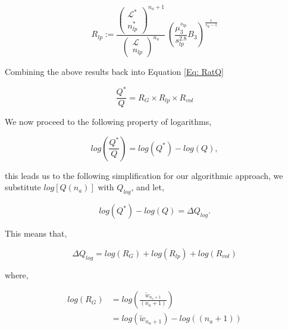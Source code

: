\documentclass[12pt,letterpaper]{article}
\newcommand{\leng}{\mathcal{L}}
\newcommand{\lr}[1]{\left( #1 \right)}
\newcommand{\lrb}[1]{\left[ #1 \right]}
\begin{document}
\begin{equation}
    R_{lp}:=
    \frac{
        \lr{
        \begin{array}{c}
             \leng^{*}\\
             n_{lp}^{*} 
        \end{array}
        }^{n_a+1}   
}{
        \lr{
        \begin{array}{c}
             \leng\\
             n_{lp}
        \end{array}
        }^{n_a}
}
~
\lr{
    \frac{
        \mu_3^{
            s_{lp}
        }
    }{
        s_{lp}^{2.8}
    }
    B_3
}
^{
    \frac{
        r
    }{
        s_{lp}-1
    }
}
\end{equation}


Combining the above results back into Equation \ref{Eq: RatQ}


\begin{equation}
    \frac{
        Q^{*}
    }{
        Q
    }
    =
    R_{G}
    \times
    R_{lp}
    \times
    R_{vol}
\label{finalflee}
\end{equation}

We now proceed to the following property of logarithms, 

\begin{equation}
    log
    \lr{
    \frac{
            Q^{*}
        }{
            Q
        }
    }
    =
    log(Q^{*})-log(Q),
\end{equation}

this leads us to the following simplification for our algorithmic approach, we substitute $log\lrb{Q(n_a)}$ with $Q_{log}$, and let,

\begin{equation}
log(Q^{*})
-
log(Q)
=
\Delta Q_{log}.
\label{eq.letdeltaq}
\end{equation}

This means that,

\begin{equation}
    \Delta Q_{log}    
    =
    log\lr{
        R_{G}
    }
    +
    log\lr{
        R_{lp}
    }
    +
    log\lr{
        R_{vol}
    }
\end{equation}

where,

\begin{align}
    log
    \lr{
    R_{G}
    }
    &=
    log
    \lr{
    \frac{
                \tilde{w}_{n_a+1}       
    }{ 
            (n_a+1)
    }
    }\\
    &=
    log
    \lr{
        \tilde{w}_{n_a+1} 
    }
    -
    log
    \lr{
        (n_a+1)
    }    
   \label{Eq: logRG}
\end{align}
\end{document}
